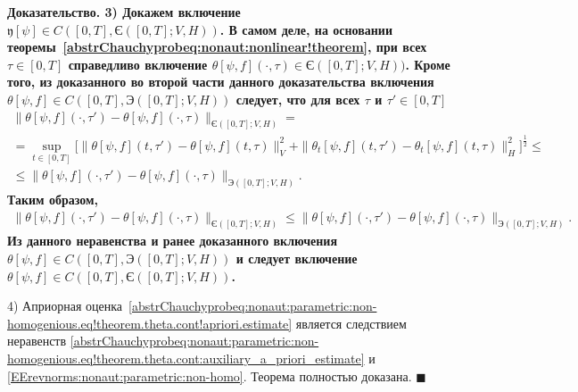 \documentclass{report}
\newcounter{rem}[section]
\newcounter{theor}[section]
\newenvironment{Proof}{\par\noindent\bf Доказательство.\rm}{ $\blacksquare$\par}
\begin{document}
\begin{Proof}
3) Докажем включение $\mathfrak{y}[\psi]\in C([0,T],\textrm{Є}([0,T];V,H))$. В самом деле, на основании теоремы~\ref{abstrChauchyprobeq:nonaut:nonlinear!theorem}, при всех $\tau\in[0,T]$ справедливо включение $\theta[\psi,f](\cdot,\tau)\in \textrm{Є}([0,T];V,H))$. Кроме того, из доказанного во второй части данного доказательства включения $\theta[\psi,f]\in C([0,T],\textrm{Э}([0,T];V,H))$ следует, что для всех $\tau$ и $\tau'\in[0,T]$
\begin{gather*}
\|\theta[\psi,f](\cdot,\tau')-\theta[\psi,f](\cdot,\tau)\|_{\textrm{Є}([0,T];V,H)}=\\
=\sup\limits_{t\in[0,T]}\biggl[\|\theta[\psi,f](t,\tau')-\theta[\psi,f](t,\tau)\|_V^2+\|\theta_t[\psi,f](t,\tau')-\theta_t[\psi,f](t,\tau)\|_H^2\biggr]^{\frac12}\leqslant\\
\leqslant\|\theta[\psi,f](\cdot,\tau')-\theta[\psi,f](\cdot,\tau)\|_{\textrm{Э}([0,T];V,H)}.
\end{gather*}
Таким образом,
\begin{gather}\label{EErevnorms:nonaut:parametric:non-homo}
\|\theta[\psi,f](\cdot,\tau')-\theta[\psi,f](\cdot,\tau)\|_{\textrm{Є}([0,T];V,H)}\leqslant\|\theta[\psi,f](\cdot,\tau')-\theta[\psi,f](\cdot,\tau)\|_{\textrm{Э}([0,T];V,H)}.
\end{gather}
Из данного неравенства и ранее доказанного включения $\theta[\psi,f]\in C([0,T],\textrm{Э}([0,T];V,H))$ и следует включение $\theta[\psi,f]\in C([0,T],\textrm{Є}([0,T];V,H))$.

4) Априорная оценка~\eqref{abstrChauchyprobeq:nonaut:parametric:non-homogenious.eq!theorem.theta.cont!apriori.estimate} является следствием неравенств 
\eqref{abstrChauchyprobeq:nonaut:parametric:non-homogenious.eq!theorem.theta.cont:auxiliary_a_priori_estimate} и \eqref{EErevnorms:nonaut:parametric:non-homo}. Теорема полностью доказана.
\end{Proof}
\end{document}
